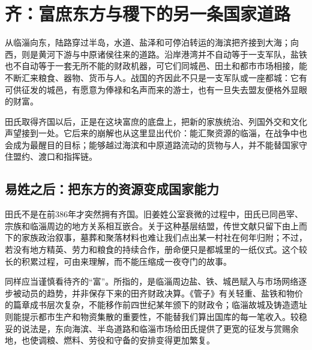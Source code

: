 \section{齐：富庶东方与稷下的另一条国家道路}

从临淄向东，陆路穿过半岛，水道、盐泽和可停泊转运的海滨把齐接到大海；向西，则是黄河下游与中原诸侯往来的道路。沿岸港湾并不自动等于一支军队，盐铁也不自动等于一套无所不能的财政机器，可它们同城邑、田土和都市市场相接，能不断汇来粮食、器物、货币与人。战国的齐因此不只是一支军队或一座都城：它有可供征发的城邑，有愿意为俸禄和名声而来的游士，也有一旦失去盟友便格外显眼的财富。

田氏取得齐国以后，正是在这块富庶的底盘上，把新的家族统治、列国外交和文化声望接到一处。它后来的崩解也从这里显出代价：能汇聚资源的临淄，在战争中也会成为最醒目的目标；能够越过海滨和中原道路流动的货物与人，并不能替国家守住盟约、渡口和指挥链。

\subsection{易姓之后：把东方的资源变成国家能力}

田氏不是在前386年才突然拥有齐国。旧姜姓公室衰微的过程中，田氏已同邑宰、宗族和临淄周边的地方关系相互嵌合。关于这种基层结盟，传世文献只留下由上而下的家族政治叙事，墓葬和聚落材料也难让我们点出某一村社在何年归附；不过，若没有地方精英、劳力和粮食的持续合作，册命便只是都城里的一纸仪式。这个较长的积累过程，可由来理解，而不能压缩成一夜夺门的故事。

同样应当谨慎看待齐的“富”。所指的，是临淄周边盐、铁、城邑赋入与市场网络逐步被动员的趋势，并非保存下来的田齐财政决算。《管子》有关轻重、盐铁和物价的篇章成书层次复杂，不能移作前四世纪某年颁下的财政令；临淄故城及铸造遗址则能提示都市生产和物资集散的重要性，不能替我们算出国库的每一笔收入。较稳妥的说法是，东向海滨、半岛道路和临淄市场给田氏提供了更宽的征发与赏赐余地，也使调粮、燃料、劳役和守备的安排变得更加繁复。

